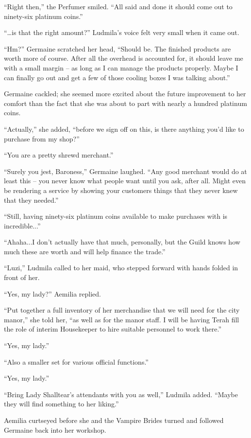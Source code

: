 “Right then,” the Perfumer smiled. “All said and done it should come out to ninety-six platinum coins.”

 

“…is that the right amount?” Ludmila’s voice felt very small when it came out.

 

“Hm?” Germaine scratched her head, “Should be. The finished products are worth more of course. After all the overhead is accounted for, it should leave me with a small margin – as long as I can manage the products properly. Maybe I can finally go out and get a few of those cooling boxes I was talking about.”

 

Germaine cackled; she seemed more excited about the future improvement to her comfort than the fact that she was about to part with nearly a hundred platinum coins.

 

“Actually,” she added, “before we sign off on this, is there anything you’d like to purchase from my shop?”

 

“You are a pretty shrewd merchant.”

 

“Surely you jest, Baroness,” Germaine laughed. “Any good merchant would do at least this – you never know what people want until you ask, after all. Might even be rendering a service by showing your customers things that they never knew that they needed.”

 

“Still, having ninety-six platinum coins available to make purchases with is incredible...”

 

“Ahaha...I don’t actually have that much, personally, but the Guild knows how much these are worth and will help finance the trade.”

 

“Luzi,” Ludmila called to her maid, who stepped forward with hands folded in front of her.

 

“Yes, my lady?” Aemilia replied.

 

“Put together a full inventory of her merchandise that we will need for the city manor,” she told her, “as well as for the manor staff. I will be having Terah fill the role of interim Housekeeper to hire suitable personnel to work there.”

 

“Yes, my lady.”

 

“Also a smaller set for various official functions.”

 

“Yes, my lady.”

 

“Bring Lady Shalltear’s attendants with you as well,” Ludmila added. “Maybe they will find something to her liking.”

 

Aemilia curtseyed before she and the Vampire Brides turned and followed Germaine back into her workshop.